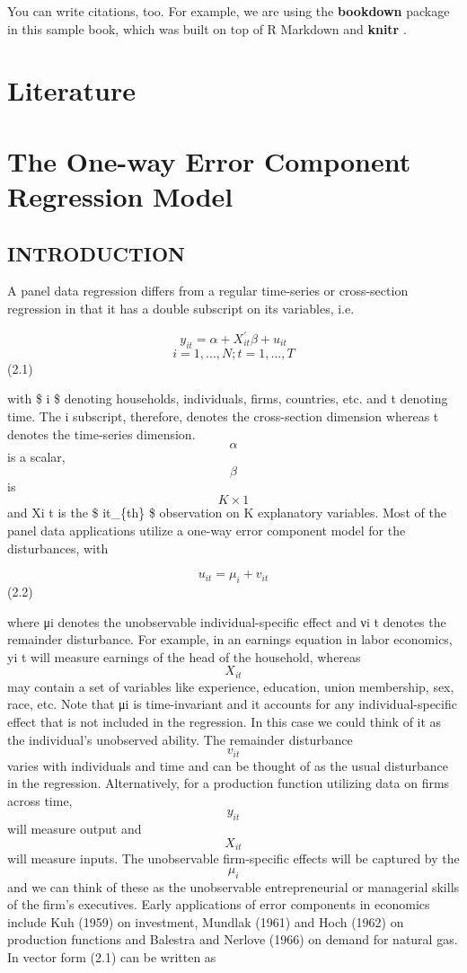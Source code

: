 \documentclass[
]{book}
\begin{document}
You can write citations, too. For example, we are using the \textbf{bookdown} package \citep{R-bookdown} in this sample book, which was built on top of R Markdown and \textbf{knitr} \citep{xie2015}.

\hypertarget{literature}{%
\chapter{Literature}\label{literature}}

\hypertarget{the-one-way-error-component-regression-model}{%
\chapter{The One-way Error Component Regression Model}\label{the-one-way-error-component-regression-model}}

\hypertarget{introduction}{%
\section{INTRODUCTION}\label{introduction}}

A panel data regression differs from a regular time-series or cross-section regression in that it has a double subscript on its variables, i.e.

\[  y_{it}= \alpha + X_{it}^{'} \beta + u_{it}                      \] \[ i=1, ... , N  ; t=1, ... ,T  \] (2.1)

with \$ i \$ denoting households, individuals, firms, countries, etc. and t denoting time. The i subscript, therefore, denotes the cross-section dimension whereas t denotes the time-series dimension. \[ \alpha  \] is a scalar, \[ \beta \] is \[ K × 1 \] and Xi t is the \$ it\_\{th\} \$ observation on K explanatory variables. Most of the panel data applications utilize a one-way error component model for the disturbances, with

\[ u_{it}= \mu_i +  v_{it}      \] (2.2)

where μi denotes the unobservable individual-specific effect and νi t denotes the remainder disturbance. For example, in an earnings equation in labor economics, yi t will measure earnings of the head of the household, whereas \[ X_{it} \] may contain a set of variables like experience, education, union membership, sex, race, etc. Note that μi is time-invariant and it accounts for any individual-specific effect that is not included in the regression. In this case we could think of it as the individual's unobserved ability. The remainder disturbance \[ v_{it} \] varies with individuals and time and can be thought of as the usual disturbance in the regression. Alternatively, for a production function utilizing data on firms across time, \[ y_{it} \] will measure output and \[ X_{it} \] will measure inputs. The unobservable firm-specific effects will be captured by the \[ \mu_i \] and we can think of these as the unobservable entrepreneurial or managerial skills of the firm's executives. Early applications of error components in economics include Kuh (1959) on investment, Mundlak (1961) and Hoch (1962) on production functions and Balestra and Nerlove (1966) on demand for natural gas. In vector form (2.1) can be written as
\end{document}
